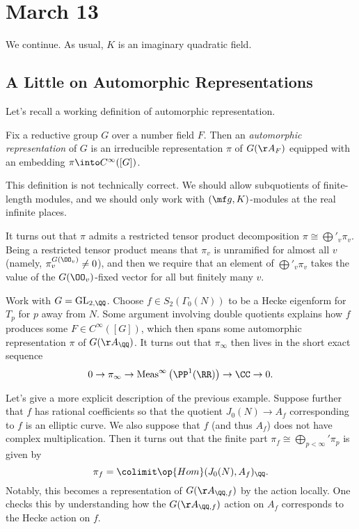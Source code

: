 \documentclass[../notes.tex]{subfiles}
\begin{document}
\section{March 13}
We continue. As usual, $K$ is an imaginary quadratic field.

\subsection{A Little on Automorphic Representations}
Let's recall a working definition of automorphic representation.
\begin{definition}
	Fix a reductive group $G$ over a number field $F$. Then an \textit{automorphic representation} of $G$ is an irreducible representation $\pi$ of $G(\AA_F)$ equipped with an embedding $\pi\into C^\infty([G])$.
\end{definition}
\begin{remark}
	This definition is not technically correct. We should allow subquotients of finite-length modules, and we should only work with $(\mf g,K)$-modules at the real infinite places.
\end{remark}
\begin{remark}
	It turns out that $\pi$ admits a restricted tensor product decomposition $\pi\cong\bigoplus'_v\pi_v$. Being a restricted tensor product means that $\pi_v$ is unramified for almost all $v$ (namely, $\pi_v^{G(\OO_v)}\ne0$), and then we require that an element of $\bigoplus'_v\pi_v$ takes the value of the $G(\OO_v)$-fixed vector for all but finitely many $v$.
\end{remark}
\begin{example}
	Work with $G=\mathrm{GL}_{2,\QQ}$. Choose $f\in S_2(\Gamma_0(N))$ to be a Hecke eigenform for $T_p$ for $p$ away from $N$. Some argument involving double quotients explains how $f$ produces some $F\in C^\infty([G])$, which then spans some automorphic representation $\pi$ of $G(\AA_\QQ)$. It turns out that $\pi_\infty$ then lives in the short exact sequence
	\[0\to\pi_\infty\to\mathrm{Meas}^\infty\left(\PP^1(\RR)\right)\to\CC\to0.\]
\end{example}
\begin{remark} \label{rem:better-cuspidal-rep-from-eigenform}
	Let's give a more explicit description of the previous example. Suppose further that $f$ has rational coefficients so that the quotient $J_0(N)\to A_f$ corresponding to $f$ is an elliptic curve. We also suppose that $f$ (and thus $A_f$) does not have complex multiplication. Then it turns out that the finite part $\pi_f\cong\bigoplus_{p<\infty}'\pi_p$ is given by
	\[\pi_f=\colimit\op{Hom}(J_0(N),A_f)_\QQ.\]
	Notably, this becomes a representation of $G(\AA_{\QQ,f})$ by the action locally. One checks this by understanding how the $G(\AA_{\QQ,f})$ action on $A_f$ corresponds to the Hecke action on $f$.
\end{remark}
\end{document}

